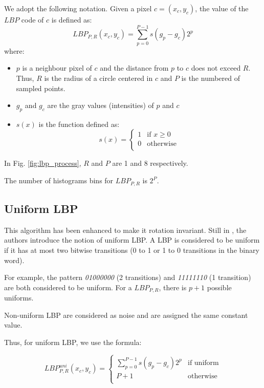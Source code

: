 We adopt the following notation. Given a pixel $c = (x_c, y_c)$, the value of the $LBP$ code of $c$ is defined as:
$$LBP_{P, R} (x_c, y_c) = \sum_{p = 0}^{P - 1} s (g_p - g_c) 2^p$$
where:
\begin{itemize}
    \item $p$ is a neighbour pixel of $c$ and the distance from $p$ to $c$ does not exceed $R$. Thus, $R$ is the radius of a circle centered in $c$ and $P$ is the numbered of sampled points.
    \item $g_p$ and $g_c$ are the gray values (intensities) of $p$ and $c$
    \item $s(x)$ is the function defined as:
    \begin{equation}
    s(x) =
    \begin{cases}
    1 & \text{if $x \geq 0$}\\
    0 & \text{otherwise} \\
    \end{cases}
    \end{equation}
\end{itemize}

In Fig. \ref{fig:lbp_process}, $R$ and $P$ are 1 and 8 respectively.

The number of histograms bins for $LBP_{P, R}$ is $2^P$.

\subsection{Uniform LBP}

This algorithm has been enhanced to make it rotation invariant. Still in \cite{Ojala2002}, the authors introduce the notion of uniform LBP. A LBP is considered to be uniform if it has at most two bitwise transitions (0 to 1 or 1 to 0 transitions in the binary word). 

For example, the pattern \textit{01000000}  (2 transitions) and \textit{11111110} (1 transition) are both considered to be uniform. For a $LBP_{P, R}$, there is $p + 1$ possible uniforms.

Non-uniform LBP are considered as noise and are assigned the same constant value.

Thus, for uniform LBP, we use the formula:

$$
LBP_{P, R}^{uni} (x_c, y_c) = 
\begin{cases} \displaystyle
\sum_{p = 0}^{P - 1} s (g_p - g_c) 2^p & \text{if uniform} \\
P + 1 & \text{otherwise} \\
\end{cases}
$$

